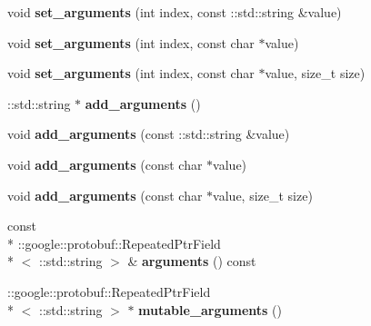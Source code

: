 \begin{DoxyCompactItemize}
\item 
\hypertarget{classSimpleChat_1_1ChatCommand_a7ae743707068ed6ab7effe3ffe403683}{void {\bfseries set\-\_\-arguments} (int index, const \-::std\-::string \&value)}\label{classSimpleChat_1_1ChatCommand_a7ae743707068ed6ab7effe3ffe403683}

\item 
\hypertarget{classSimpleChat_1_1ChatCommand_aaaf34f8602b40e6e7ee042a968444561}{void {\bfseries set\-\_\-arguments} (int index, const char $\ast$value)}\label{classSimpleChat_1_1ChatCommand_aaaf34f8602b40e6e7ee042a968444561}

\item 
\hypertarget{classSimpleChat_1_1ChatCommand_a8843db32f49ccc95df7be81ac87ef30b}{void {\bfseries set\-\_\-arguments} (int index, const char $\ast$value, size\-\_\-t size)}\label{classSimpleChat_1_1ChatCommand_a8843db32f49ccc95df7be81ac87ef30b}

\item 
\hypertarget{classSimpleChat_1_1ChatCommand_a1fe6ecffe560111fd70c63bfc7d2d5ac}{\-::std\-::string $\ast$ {\bfseries add\-\_\-arguments} ()}\label{classSimpleChat_1_1ChatCommand_a1fe6ecffe560111fd70c63bfc7d2d5ac}

\item 
\hypertarget{classSimpleChat_1_1ChatCommand_a8b40c75dca550be48ff0bd0e269ff044}{void {\bfseries add\-\_\-arguments} (const \-::std\-::string \&value)}\label{classSimpleChat_1_1ChatCommand_a8b40c75dca550be48ff0bd0e269ff044}

\item 
\hypertarget{classSimpleChat_1_1ChatCommand_a01eecca4297ef851470a470be454c714}{void {\bfseries add\-\_\-arguments} (const char $\ast$value)}\label{classSimpleChat_1_1ChatCommand_a01eecca4297ef851470a470be454c714}

\item 
\hypertarget{classSimpleChat_1_1ChatCommand_ac500d8d945c3095f8767f466afe236ae}{void {\bfseries add\-\_\-arguments} (const char $\ast$value, size\-\_\-t size)}\label{classSimpleChat_1_1ChatCommand_ac500d8d945c3095f8767f466afe236ae}

\item 
\hypertarget{classSimpleChat_1_1ChatCommand_a9d57dcd9936f8f62045402f1f0aed5d7}{const \\*
\-::google\-::protobuf\-::\-Repeated\-Ptr\-Field\\*
$<$ \-::std\-::string $>$ \& {\bfseries arguments} () const }\label{classSimpleChat_1_1ChatCommand_a9d57dcd9936f8f62045402f1f0aed5d7}

\item 
\hypertarget{classSimpleChat_1_1ChatCommand_ac73d5f45aaaa51d3d9cf81cce8c96ffa}{\-::google\-::protobuf\-::\-Repeated\-Ptr\-Field\\*
$<$ \-::std\-::string $>$ $\ast$ {\bfseries mutable\-\_\-arguments} ()}\label{classSimpleChat_1_1ChatCommand_ac73d5f45aaaa51d3d9cf81cce8c96ffa}

\end{DoxyCompactItemize}
